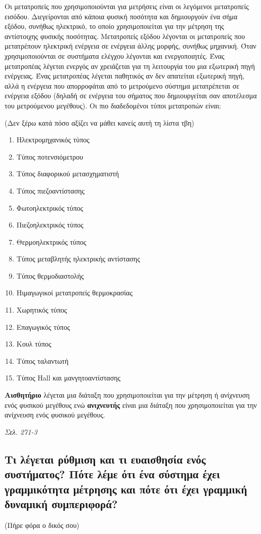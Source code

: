 \documentclass{article}
\begin{document}
Οι μετατροπείς που χρησιμοποιούνται για μετρήσεις είναι οι λεγόμενοι μετατροπείς εισόδου. Διεγείρονται από κάποια φυσική ποσότητα και δημιουργούν ένα σήμα εξόδου, συνήθως
ηλεκτρικό, το οποίο χρησιμοποιείται για την μέτρηση της αντίστοιχης φυσικής ποσότητας. Μετατροπείς εξόδου λέγονται οι μετατροπείς που μετατρέπουν ηλεκτρική ενέργεια 
σε ενέργεια άλλης μορφής, συνήθως μηχανική. Όταν χρησιμοποιούνται σε συστήματα ελέγχου λέγονται και ενεργοποιητές. Ένας μετατροπέας λέγεται ενεργός αν χρειάζεται 
για τη λειτουργία του μια εξωτερική πηγή ενέργειας. Ένας μετατροπέας λέγεται παθητικός αν δεν απατείται εξωτερική πηγή, αλλά η ενέργεια που απορροφάται από το μετρούμενο
σύστημα μετατρέπεται σε ενέργεια εξόδου (δηλαδή σε ενέργεια του σήματος που δημιουργείται σαν αποτέλεσμα του μετρούμενου μεγέθους). Οι πιο διαδεδομένοι τύποι μετατροπών 
είναι:

(Δεν ξέρω κατά πόσο αξίζει να μάθει κανείς αυτή τη λίστα τβη)

\begin{enumerate}
    \item Ηλεκτρομηχανικός τύπος 
    \item Τύπος ποτενσιόμετρου
    \item Τύπος διαφορικού μετασχηματιστή
    \item Τύπος πιεζοαντίστασης
    \item Φωτοηλεκτρικός τύπος
    \item Πιεζοηλεκτρικός τύπος 
    \item Θερμοηλεκτρικός τύπος
    \item Τύπος μεταβλητής ηλεκτρικής αντίστασης
    \item Τύπος θερμοδιαστολής
    \item Ηιμαγωγικοί μετατροπείς θερμοκρασίας
    \item Χωρητικός τύπος 
    \item Επαγωγικός τύπος
    \item Κουλ τύπος
    \item Τύπος ταλαντωτή
    \item Τύπος \foreignlanguage{english}{Hall} και μανγητοαντίστασης
\end{enumerate}

\textbf{Αισθητήριο} λέγεται μια διάταξη που χρησιμοποιείται για την μέτρηση ή ανίχνευση ενός φυσικού μεγέθους ενώ \textbf{ανιχνευτής} είναι μια διάταξη που 
χρησιμοποιείται για την ανίχνευση ενός φυσικού μεγέθους.

\emph{Σελ. 271-3}
\subsection{Τι λέγεται ρύθμιση και τι ευαισθησία ενός συστήματος? Πότε λέμε ότι ένα σύστημα έχει γραμμικότητα μέτρησης και πότε ότι έχει γραμμική δυναμική συμπεριφορά?}
\scriptsize (Πήρε φόρα ο δικός σου)
\normalsize
\end{document}
